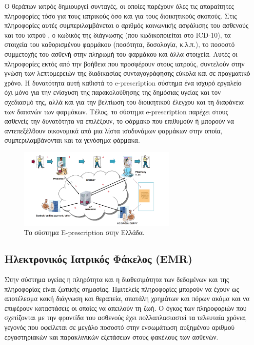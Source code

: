 	Ο θεράπων ιατρός δημιουργεί συνταγές, οι οποίες παρέχουν όλες τις απαραίτητες πληροφορίες τόσο για τους ιατρικούς όσο και για τους διοικητικούς σκοπούς.  Στις πληροφορίες αυτές συμπεριλαμβάνεται ο αριθμός κοινωνικής ασφάλισης  του ασθενούς και του ιατρού , ο κωδικός της διάγνωσης (που κωδικοποιείται στο ICD-10), τα στοιχεία του καθορισμένου φαρμάκου (ποσότητα, δοσολογία, κ.λ.π.), το ποσοστό συμμετοχής του ασθενή στην πληρωμή του φαρμάκου και άλλα στοιχεία.  Αυτές οι πληροφορίες εκτός από την βοήθεια που προσφέρουν στους ιατρούς, συντελούν στην γνώση των λεπτομερειών της διαδικασίας συνταγογράφησης εύκολα και σε πραγματικό χρόνο. Η δυνατότητα αυτή καθιστά το e-prescription σύστημα ένα ισχυρό εργαλείο όχι μόνο για την ενίσχυση της παρακολούθησης της δημόσιας υγείας και τον σχεδιασμό της, αλλά και για την βελτίωση του διοικητικού έλεγχου
και τη διαφάνεια των δαπανών των φαρμάκων. Τέλος, το σύστημα e-prescription παρέχει στους ασθενείς την δυνατότητα να  επιλέξουν, το φάρμακο που επιθυμούν ή μπορούν να αντεπεξέλθουν οικονομικά από μια λίστα ισοδυνάμων φαρμάκων στην οποία, συμπεριλαμβάνονται και τα γενόσημα φάρμακα. 

	\begin{figure}[h]
	    \centering
	    \includegraphics[width=0.7\textwidth]{e-prescr.png}
	    \caption{Το σύστημα E-prescription στην Ελλάδα. }
	    \label{fig:prescr}
	\end{figure}


	

	
	\subsection{Ηλεκτρονικός Ιατρικός Φάκελος (EMR)}

		Στην σύστημα υγείας η πληρότητα και η διαθεσιμότητα των δεδομένων και της πληροφορίας είναι ζωτικής σημασίας. Ημιτελείς πληροφορίες μπορούν να έχουν ως αποτέλεσμα κακή διάγνωση και θεραπεία, σπατάλη χρημάτων και πόρων ακόμα και να επιφέρουν καταστάσεις οι οποίες να απειλούν τη ζωή. Ο όγκος των πληροφοριών που σχετίζονται με την φροντίδα του ασθενούς έχει πολλαπλασιαστεί τα τελευταία χρόνια, γεγονός που οφείλεται σε μεγάλο ποσοστό στην ενσωμάτωση αυξημένου αριθμού εργαστηριακών και παρακλινικών εξετάσεων στους φακέλους των ασθενών.
	
